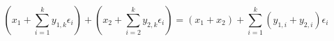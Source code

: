 






$$
(x_1 + \sum_{i = 1}^{k} y_{1,k} \epsilon_i) + ( x_2 + \sum_{i = 2}^{k} y_{2,k} \epsilon_i) = (x_1 + x_2) + \sum_{i = 1}^{k} (y_{1, i} + y_{2, i}) \epsilon_i
$$












